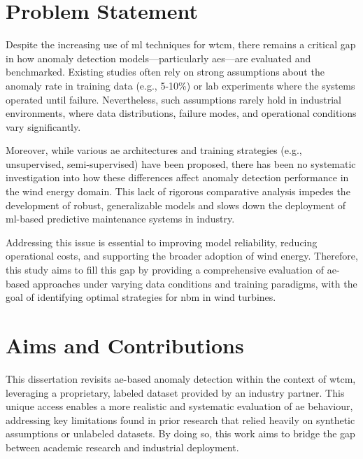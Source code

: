 \section{Problem Statement}
\label{sec:problem-statement}
Despite the increasing use of \gls{ml} techniques for \gls{wtcm}, there remains a critical gap in how anomaly detection models—particularly \glspl{ae}—are evaluated and benchmarked.
Existing studies often rely on strong assumptions about the anomaly rate in training data (e.g., 5-10\%) or lab experiments where the systems operated until failure.
Nevertheless, such assumptions rarely hold in industrial environments, where data distributions, failure modes, and operational conditions vary significantly.

Moreover, while various \gls{ae} architectures and training strategies (e.g., unsupervised, semi-supervised) have been proposed, there has been no systematic investigation into how these differences affect anomaly detection performance in the wind energy domain.
This lack of rigorous comparative analysis impedes the development of robust, generalizable models and slows down the deployment of \gls{ml}-based predictive maintenance systems in industry.

Addressing this issue is essential to improving model reliability, reducing operational costs, and supporting the broader adoption of wind energy.
Therefore, this study aims to fill this gap by providing a comprehensive evaluation of \gls{ae}-based approaches under varying data conditions and training paradigms, with the goal of identifying optimal strategies for \gls{nbm} in wind turbines.

\section{Aims and Contributions}
\label{sec:aims}
This dissertation revisits \gls{ae}-based anomaly detection within the context of \gls{wtcm}, leveraging a proprietary, labeled dataset provided by an industry partner.
This unique access enables a more realistic and systematic evaluation of \gls{ae} behaviour, addressing key limitations found in prior research that relied heavily on synthetic assumptions or unlabeled datasets.
By doing so, this work aims to bridge the gap between academic research and industrial deployment.

